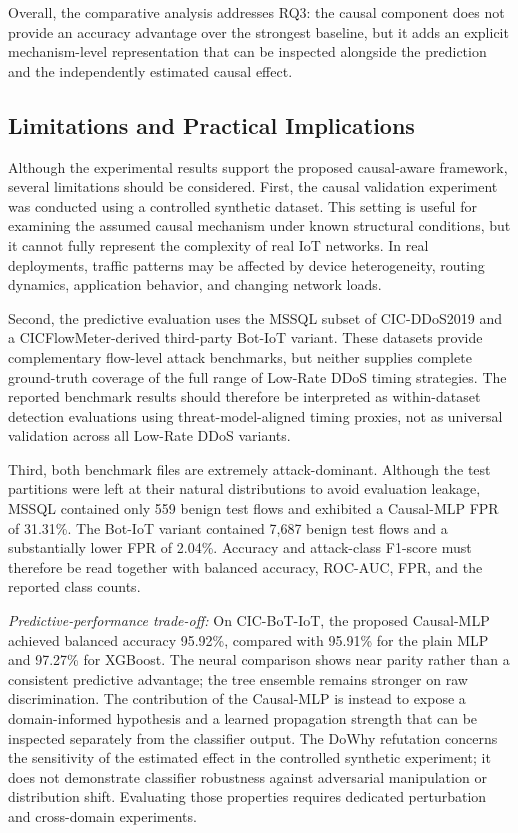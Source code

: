 \documentclass[journal]{IEEEtran}
\begin{document}
Overall, the comparative analysis addresses RQ3: the causal component does not
provide an accuracy advantage over the strongest baseline, but it adds an
explicit mechanism-level representation that can be inspected alongside the
prediction and the independently estimated causal effect.

\subsection{Limitations and Practical Implications}
\label{subsec:limitations_implications}

Although the experimental results support the proposed causal-aware framework, several limitations should be considered. First, the causal validation experiment was conducted using a controlled synthetic dataset. This setting is useful for examining the assumed causal mechanism under known structural conditions, but it cannot fully represent the complexity of real IoT networks. In real deployments, traffic patterns may be affected by device heterogeneity, routing dynamics, application behavior, and changing network loads.

Second, the predictive evaluation uses the MSSQL subset of CIC-DDoS2019 and a
CICFlowMeter-derived third-party Bot-IoT variant. These datasets provide
complementary flow-level attack benchmarks, but neither supplies complete
ground-truth coverage of the full range of Low-Rate DDoS timing strategies.
The reported benchmark results should therefore be interpreted as
within-dataset detection evaluations using threat-model-aligned timing
proxies, not as universal validation across all Low-Rate DDoS variants.

Third, both benchmark files are extremely attack-dominant. Although the test
partitions were left at their natural distributions to avoid evaluation
leakage, MSSQL contained only 559 benign test flows and exhibited a Causal-MLP
FPR of 31.31\%. The Bot-IoT variant contained 7,687 benign test flows and a
substantially lower FPR of 2.04\%. Accuracy and attack-class F1-score must
therefore be read together with balanced accuracy, ROC-AUC, FPR, and the
reported class counts.

\textit{Predictive-performance trade-off:}
On CIC-BoT-IoT, the proposed Causal-MLP achieved balanced accuracy 95.92\%,
compared with 95.91\% for the plain MLP and 97.27\% for XGBoost. The neural
comparison shows near parity rather than a consistent predictive advantage;
the tree ensemble remains stronger on raw discrimination. The contribution of
the Causal-MLP is instead to expose a domain-informed hypothesis and a learned
propagation strength that can be inspected separately from the classifier
output. The DoWhy refutation concerns the sensitivity of the estimated effect
in the controlled synthetic experiment; it does not demonstrate classifier
robustness against adversarial manipulation or distribution shift. Evaluating
those properties requires dedicated perturbation and cross-domain experiments.
\end{document}
